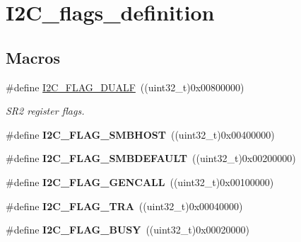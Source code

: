 \hypertarget{group___i2_c__flags__definition}{}\section{I2\+C\+\_\+flags\+\_\+definition}
\label{group___i2_c__flags__definition}
\subsection*{Macros}
\begin{DoxyCompactItemize}
\item 
\hypertarget{group___i2_c__flags__definition_ga3755b783aa73568659478c2e2e45e27f}{}\#define \hyperlink{group___i2_c__flags__definition_ga3755b783aa73568659478c2e2e45e27f}{I2\+C\+\_\+\+F\+L\+A\+G\+\_\+\+D\+U\+A\+L\+F}~((uint32\+\_\+t)0x00800000)\label{group___i2_c__flags__definition_ga3755b783aa73568659478c2e2e45e27f}

\begin{DoxyCompactList}\small\item\em S\+R2 register flags. \end{DoxyCompactList}\item 
\hypertarget{group___i2_c__flags__definition_gaf15403a1852f39aaadbb8942ba98d97e}{}\#define {\bfseries I2\+C\+\_\+\+F\+L\+A\+G\+\_\+\+S\+M\+B\+H\+O\+S\+T}~((uint32\+\_\+t)0x00400000)\label{group___i2_c__flags__definition_gaf15403a1852f39aaadbb8942ba98d97e}

\item 
\hypertarget{group___i2_c__flags__definition_ga371fb29861d1cd41736253e804c67ad5}{}\#define {\bfseries I2\+C\+\_\+\+F\+L\+A\+G\+\_\+\+S\+M\+B\+D\+E\+F\+A\+U\+L\+T}~((uint32\+\_\+t)0x00200000)\label{group___i2_c__flags__definition_ga371fb29861d1cd41736253e804c67ad5}

\item 
\hypertarget{group___i2_c__flags__definition_gab3a93b6840ad406c2fc09e0e96c59b88}{}\#define {\bfseries I2\+C\+\_\+\+F\+L\+A\+G\+\_\+\+G\+E\+N\+C\+A\+L\+L}~((uint32\+\_\+t)0x00100000)\label{group___i2_c__flags__definition_gab3a93b6840ad406c2fc09e0e96c59b88}

\item 
\hypertarget{group___i2_c__flags__definition_ga0359a5f960670d51cb17e659d32498ea}{}\#define {\bfseries I2\+C\+\_\+\+F\+L\+A\+G\+\_\+\+T\+R\+A}~((uint32\+\_\+t)0x00040000)\label{group___i2_c__flags__definition_ga0359a5f960670d51cb17e659d32498ea}

\item 
\hypertarget{group___i2_c__flags__definition_ga50f69f043d99600221076100823b6ff3}{}\#define {\bfseries I2\+C\+\_\+\+F\+L\+A\+G\+\_\+\+B\+U\+S\+Y}~((uint32\+\_\+t)0x00020000)\label{group___i2_c__flags__definition_ga50f69f043d99600221076100823b6ff3}


\end{DoxyCompactItemize}
